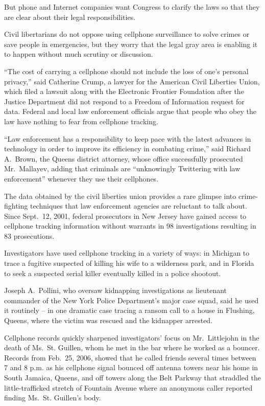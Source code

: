 ﻿\documentclass[12pt]{article}
\begin{document}
But phone and Internet companies want Congress to clarify the laws so that they are clear about
their legal responsibilities.

Civil libertarians do not oppose using cellphone surveillance to solve crimes or save people in
emergencies, but they worry that the legal gray area is enabling it to happen without much scrutiny
or discussion.

``The cost of carrying a cellphone should not include the loss of one's personal privacy,'' said
Catherine Crump, a lawyer for the American Civil Liberties Union, which filed a lawsuit along with
the Electronic Frontier Foundation after the Justice Department did not respond to a Freedom of
Information request for data. Federal and local law enforcement officials argue that people who obey
the law have nothing to fear from cellphone tracking.

``Law enforcement has a responsibility to keep pace with the latest advances in technology in order
to improve its efficiency in combating crime,'' said Richard A.~Brown, the Queens district attorney,
whose office successfully prosecuted Mr.~Mallayev, adding that criminals are ``unknowingly
Twittering with law enforcement'' whenever they use their cellphones.

The data obtained by the civil liberties union provides a rare glimpse into crime-fighting
techniques that law enforcement agencies are reluctant to talk about. Since Sept.~12, 2001, federal
prosecutors in New Jersey have gained access to cellphone tracking information without warrants in
98 investigations resulting in 83 prosecutions.

Investigators have used cellphone tracking in a variety of ways: in Michigan to trace a fugitive
suspected of killing his wife to a wilderness park, and in Florida to seek a suspected serial killer
eventually killed in a police shootout.

Joseph A.~Pollini, who oversaw kidnapping investigations as lieutenant commander of the New York
Police Department's major case squad, said he used it routinely -- in one dramatic case tracing a
ransom call to a house in Flushing, Queens, where the victim was rescued and the kidnapper arrested.

Cellphone records quickly sharpened investigators' focus on Mr.~Littlejohn in the death of Ms.~St.
Guillen, whom he met in the bar where he worked as a bouncer. Records from Feb.~25, 2006, showed
that he called friends several times between 7 and 8 p.m. as his cellphone signal bounced off
antenna towers near his home in South Jamaica, Queens, and off towers along the Belt Parkway that
straddled the little-trafficked stretch of Fountain Avenue where an anonymous caller reported
finding Ms.~St. Guillen's body.
\end{document}
